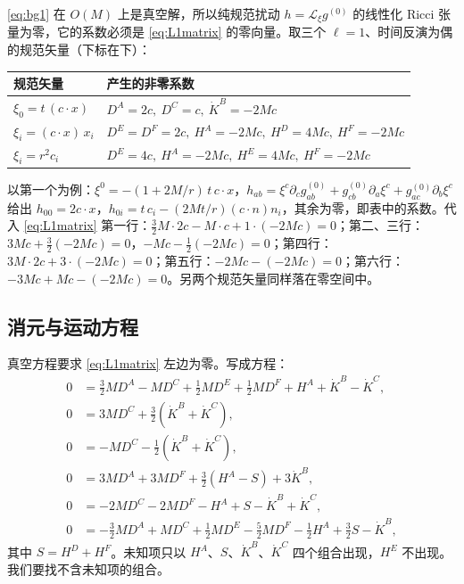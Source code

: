 \documentclass[11pt,a4paper]{ctexart}
\numberwithin{equation}{section}
\begin{document}
\eqref{eq:bg1} 在 $O(M)$ 上是真空解，所以纯规范扰动 $h=\mathcal L_\xi g^{(0)}$ 的线性化 Ricci 张量为零，它的系数必须是 \eqref{eq:L1matrix} 的零向量。取三个 $\ell=1$、时间反演为偶的规范矢量（下标在下）：
\begin{center}\small
\begin{tabular}{p{}p{}}
\hline
规范矢量 & 产生的非零系数\\
\hline
$\xi_0=t\,(c\cdot x)$ & $D^A=2c,\ D^C=c,\ \dot K^B=-2Mc$\\
$\xi_i=(c\cdot x)\,x_i$ & $D^E=D^F=2c,\ H^A=-2Mc,\ H^D=4Mc,\ H^F=-2Mc$\\
$\xi_i=r^2c_i$ & $D^E=4c,\ H^A=-2Mc,\ H^E=4Mc,\ H^F=-2Mc$\\
\hline
\end{tabular}
\end{center}
以第一个为例：$\xi^0=-(1+2M/r)\,t\,c\cdot x$，$h_{ab}=\xi^c\partial_cg^{(0)}_{ab}+g^{(0)}_{cb}\partial_a\xi^c+g^{(0)}_{ac}\partial_b\xi^c$ 给出 $h_{00}=2c\cdot x$，$h_{0i}=t\,c_i-(2Mt/r)(c\cdot n)n_i$，其余为零，即表中的系数。代入 \eqref{eq:L1matrix} 第一行：$\tfrac32M\cdot2c-M\cdot c+1\cdot(-2Mc)=0$；第二、三行：$3Mc+\tfrac32(-2Mc)=0$，$-Mc-\tfrac12(-2Mc)=0$；第四行：$3M\cdot 2c+3\cdot(-2Mc)=0$；第五行：$-2Mc-(-2Mc)=0$；第六行：$-3Mc+Mc-(-2Mc)=0$。另两个规范矢量同样落在零空间中。

\subsection{消元与运动方程}

真空方程要求 \eqref{eq:L1matrix} 左边为零。写成方程：
\begin{align}
0&=\tfrac32MD^A-MD^C+\tfrac12MD^E+\tfrac12MD^F+H^A+\dot K^B-\dot K^C,\tag{A}\\
0&=3MD^C+\tfrac32(\dot K^B+\dot K^C),\tag{B}\\
0&=-MD^C-\tfrac12(\dot K^B+\dot K^C),\tag{C}\\
0&=3MD^A+3MD^F+\tfrac32(H^A-S)+3\dot K^B,\tag{D}\\
0&=-2MD^C-2MD^F-H^A+S-\dot K^B+\dot K^C,\tag{E}\\
0&=-\tfrac32MD^A+MD^C+\tfrac12MD^E-\tfrac52MD^F-\tfrac12H^A+\tfrac32S-\dot K^B,\tag{F}
\end{align}
其中 $S=H^D+H^F$。未知项只以 $H^A$、$S$、$\dot K^B$、$\dot K^C$ 四个组合出现，$H^E$ 不出现。我们要找不含未知项的组合。
\end{document}
